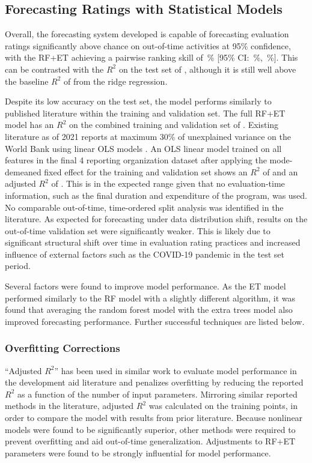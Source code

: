 \subsection{Forecasting Ratings with Statistical Models}
Overall, the forecasting system developed is capable of forecasting evaluation ratings significantly above chance on out-of-time activities at 95\% confidence, with the RF+ET achieving a pairwise ranking skill of \PairwiseModel\,\% [95\% CI: \PairwiseCILow\,\%, \PairwiseCIHigh\,\%]. This can be contrasted with the $R^2$ on the test set of \Rsqheldoutratingsllmfeatures, although it is still well above the baseline $R^2$ of \Rsqheldoutridgebaseline from the ridge regression.

Despite its low accuracy on the test set, the model performs similarly to published literature within the training and validation set. The full RF+ET model has an $R^2$ on the combined training and validation set of \RsqTraining{}. Existing literature as of 2021 reports at maximum 30\% of unexplained variance on the World Bank using linear OLS models \citep{ashtonPuzzleMissingPieces2023}. An OLS linear model trained on all features in the final 4 reporting organization dataset after applying the mode-demeaned fixed effect for the training and validation set shows an $R^2$ of \RsqTrainingOLS{} and an adjusted $R^2$ of \RsqAdjTrainingOLS{}. This is in the expected range given that no evaluation-time information, such as the final duration and expenditure of the program, was used. No comparable out-of-time, time-ordered split analysis was identified in the literature. As expected for forecasting under data distribution shift, results on the out-of-time validation set were significantly weaker. This is likely due to significant structural shift over time in evaluation rating practices and increased influence of external factors such as the COVID-19 pandemic in the test set period.

Several factors were found to improve model performance. As the ET model performed similarly to the RF model with a slightly different algorithm, it was found that averaging the random forest model with the extra trees model also improved forecasting performance. Further successful techniques are listed below.

\subsubsection{Overfitting Corrections}
``Adjusted $R^2$'' has been used in similar work to evaluate model performance in the development aid literature and penalizes overfitting by reducing the reported $R^2$ as a function of the number of input parameters. Mirroring similar reported methods in the literature, adjusted $R^2$ was calculated on the training points, in order to compare the model with results from prior literature. Because nonlinear models were found to be significantly superior, other methods were required to prevent overfitting and aid out-of-time generalization. Adjustments to RF+ET parameters were found to be strongly influential for model performance.


